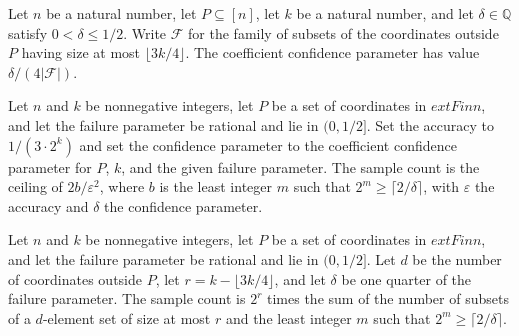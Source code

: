\begin{theorem}
\label{FABL.lowDegreeJuntaCoefficientConfidence_value}
\leanok
{}
Let $n$ be a natural number, let $P\subseteq[n]$, let $k$ be a natural number, and let
$\delta\in\mathbb{Q}$ satisfy $0<\delta\leq 1/2$. Write $\mathcal F$ for the family of
subsets of the coordinates outside $P$ having size at most $\lfloor 3k/4\rfloor$. The
coefficient confidence parameter has value $\delta/(4|\mathcal F|)$.
\end{theorem}

\begin{definition}
\label{FABL.lowDegreeJuntaCoefficientSampleCount}
\leanok
{}
Let $n$ and $k$ be nonnegative integers, let $P$ be a set of coordinates in $	ext{Fin
}n$, and let the failure parameter be rational and lie in $(0,1/2]$. Set the accuracy to
$1/(3\cdot 2^k)$ and set the confidence parameter to the coefficient confidence
parameter for $P$, $k$, and the given failure parameter. The sample count is the ceiling
of $2b/\varepsilon^2$, where $b$ is the least integer $m$ such that $2^m\geq \lceil
2/\delta\rceil$, with $\varepsilon$ the accuracy and $\delta$ the confidence parameter.
\end{definition}

\begin{definition}
\label{FABL.lowDegreeJuntaPolynomialSampleCount}
\leanok
{}
Let $n$ and $k$ be nonnegative integers, let $P$ be a set of coordinates in $	ext{Fin
}n$, and let the failure parameter be rational and lie in $(0,1/2]$. Let $d$ be the
number of coordinates outside $P$, let $r=k-\lfloor 3k/4\rfloor$, and let $\delta$ be
one quarter of the failure parameter. The sample count is $2^r$ times the sum of the
number of subsets of a $d$-element set of size at most $r$ and the least integer $m$
such that $2^m\geq\lceil 2/\delta\rceil$.
\end{definition}

